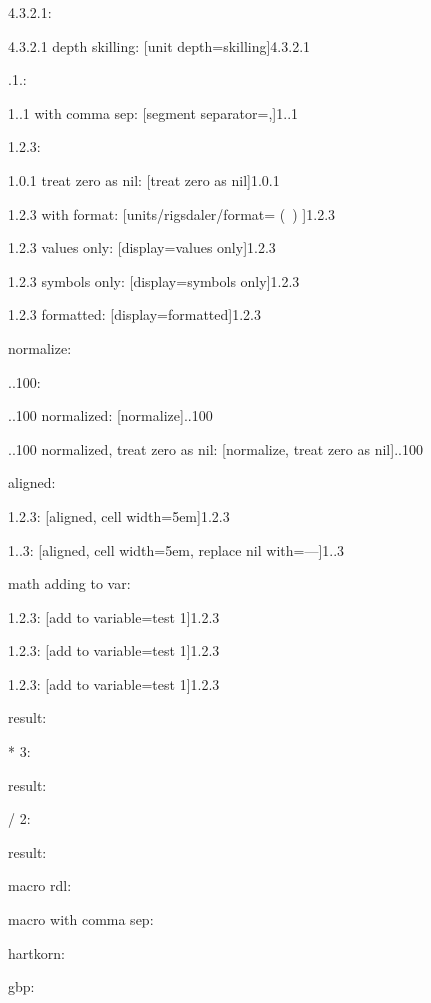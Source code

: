 \documentclass{article}
\begin{document}
4.3.2.1: \hfill {}

4.3.2.1 depth skilling: \hfill {}[unit depth=skilling]{4.3.2.1}

.1.: \hfill {}

1..1 with comma sep: \hfill {}[segment separator={,}]{1..1}

1.2.3: \hfill {}

1.0.1 treat zero as nil: \hfill {}[treat zero as nil]{1.0.1}

1.2.3 with format: \hfill {}[units/rigsdaler/format={ (\SYMBOL\ \VALUE) }]{1.2.3}

1.2.3 values only: \hfill {}[display=values only]{1.2.3}

1.2.3 symbols only: \hfill {}[display=symbols only]{1.2.3}

1.2.3 formatted: \hfill {}[display=formatted]{1.2.3}

normalize:

..100: \hfill {}

..100 normalized: \hfill {}[normalize]{..100}

..100 normalized, treat zero as nil: \hfill {}[normalize, treat zero as nil]{..100}

aligned:

1.2.3: \hfill {}[aligned, cell width=5em]{1.2.3}

1..3: \hfill {}[aligned, cell width=5em, replace nil with={---}]{1..3}

math adding to var:

1.2.3: \hfill {}[add to variable=test 1]{1.2.3}

1.2.3: \hfill {}[add to variable=test 1]{1.2.3}

1.2.3: \hfill {}[add to variable=test 1]{1.2.3}

result: \hfill {}

* 3: \hfill {}

result: \hfill {}

/ 2: \hfill {}

result: \hfill {}

macro rdl: \hfill {}

macro with comma sep: \hfill {}

hartkorn: \hfill {}

gbp: \hfill {}
\end{document}
